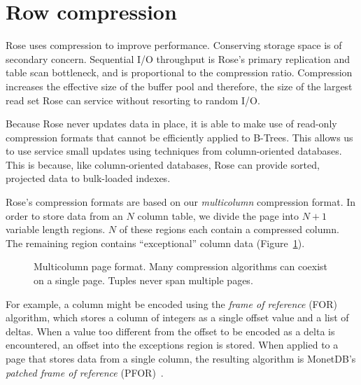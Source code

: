 \documentclass{vldb}
\newcommand{\rows}{Rose\xspace}
\newcommand{\rowss}{Rose's\xspace}
\begin{document}
\section{Row compression}

\rows uses compression to improve performance.  Conserving storage space is of
secondary concern.  Sequential I/O throughput is \rowss primary
replication and table scan bottleneck, and is proportional to the
compression ratio.  Compression increases the effective
size of the buffer pool and therefore, the size of the largest read set
\rows can service without resorting to random I/O.

Because \rows never updates data in place, it
is able to make use of read-only compression formats that cannot be
efficiently applied to B-Trees.
This allows us to use service small updates using
techniques from column-oriented databases.  This is because, like column-oriented
databases, \rows can provide sorted, projected data to bulk-loaded indexes.

\rowss compression formats are based on our
{\em multicolumn} compression format.  In order to store data from
an $N$ column table, we divide the page into $N+1$ variable length
regions.  $N$ of these regions each contain a compressed column.  The
remaining region contains ``exceptional'' column data (Figure~\ref{fig:mc-fmt}).

\begin{figure}
\centering {}
\caption{Multicolumn page format.  Many compression algorithms
can coexist on a single page.  Tuples never span multiple pages.}
\label{fig:mc-fmt}
\end{figure}

For example, a column might be encoded using the {\em frame of
  reference} (FOR) algorithm, which stores a column of integers as a
single offset value and a list of deltas.  When a value too different
from the offset to be encoded as a delta is encountered, an offset
into the exceptions region is stored.  When applied to a page that
stores data from a single column, the resulting algorithm is MonetDB's
{\em patched frame of reference} (PFOR)~\cite{pfor}.
\end{document}
